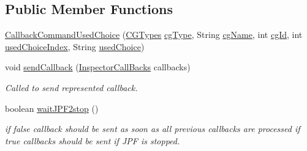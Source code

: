\subsection*{Public Member Functions}
\begin{DoxyCompactItemize}
\item 
\hyperlink{classgov_1_1nasa_1_1jpf_1_1inspector_1_1server_1_1callbacks_1_1commands_1_1_callback_command_used_choice_a787b0e06f763fd6266942cf7b691b65e}{Callback\+Command\+Used\+Choice} (\hyperlink{enumgov_1_1nasa_1_1jpf_1_1inspector_1_1interfaces_1_1_choice_generators_interface_1_1_c_g_types}{C\+G\+Types} \hyperlink{classgov_1_1nasa_1_1jpf_1_1inspector_1_1server_1_1callbacks_1_1commands_1_1_callback_command_used_choice_ab877d50d24ec11ffd927d41032e7ce13}{cg\+Type}, String \hyperlink{classgov_1_1nasa_1_1jpf_1_1inspector_1_1server_1_1callbacks_1_1commands_1_1_callback_command_used_choice_a09c25148cbdd2ccaf30eb0a53667be92}{cg\+Name}, int \hyperlink{classgov_1_1nasa_1_1jpf_1_1inspector_1_1server_1_1callbacks_1_1commands_1_1_callback_command_used_choice_a04c9b7cfbd7d587dd988c6240bf9626f}{cg\+Id}, int \hyperlink{classgov_1_1nasa_1_1jpf_1_1inspector_1_1server_1_1callbacks_1_1commands_1_1_callback_command_used_choice_ab3fd7e97cf146c916bdaf5758c52ae9c}{used\+Choice\+Index}, String \hyperlink{classgov_1_1nasa_1_1jpf_1_1inspector_1_1server_1_1callbacks_1_1commands_1_1_callback_command_used_choice_a391fd3bca9375bce374e2535cb7c8d62}{used\+Choice})
\item 
void \hyperlink{classgov_1_1nasa_1_1jpf_1_1inspector_1_1server_1_1callbacks_1_1commands_1_1_callback_command_used_choice_a94bd9e411f615a9d2f16b1b93f593b7a}{send\+Callback} (\hyperlink{interfacegov_1_1nasa_1_1jpf_1_1inspector_1_1interfaces_1_1_inspector_call_backs}{Inspector\+Call\+Backs} callbacks)
\begin{DoxyCompactList}\small\item\em Called to send represented callback. \end{DoxyCompactList}\item 
boolean \hyperlink{classgov_1_1nasa_1_1jpf_1_1inspector_1_1server_1_1callbacks_1_1commands_1_1_callback_command_used_choice_ac9f4c3b7073de17dad9eb1487e471983}{wait\+J\+P\+F2stop} ()
\begin{DoxyCompactList}\small\item\em if false callback should be sent as soon as all previous callbacks are processed if true callbacks should be sent if J\+PF is stopped. \end{DoxyCompactList}\end{DoxyCompactItemize}
